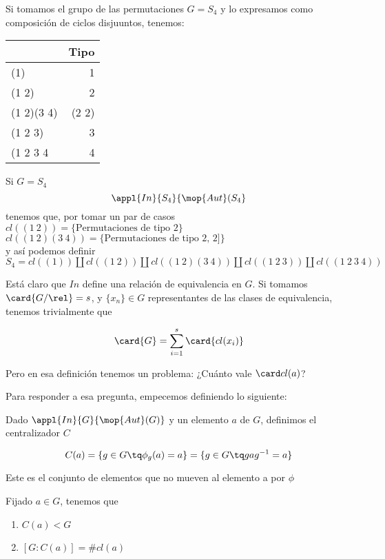 \documentclass[nochap]{apuntes}
\begin{document}
\begin{example}
Si tomamos el grupo de las permutaciones $G=S_4$ y lo expresamos como composición de ciclos disjuuntos, tenemos:\\
\begin{center}
\begin{tabular}{|l|r|}
\hline
& Tipo\\ 
\hline
(1) & 1\\
(1 2) & 2\\
(1 2)(3 4) & (2 2)\\
(1 2 3) & 3\\
(1 2 3 4 & 4\\
\hline
\end{tabular}
\end{center}
Si $G=S_4$\\
$$\appl{In}{S_4}{\mop{Aut}(S_4}$$
tenemos que, por tomar un par de casos
$cl((1\ 2)) = \{ \text{Permutaciones de tipo 2} \}$\\
$cl((1\ 2)(3\ 4)) = \{ \text{Permutaciones de tipo 2, 2]} \}$\\
y así podemos definir\\
$S_4 = cl((1)) \coprod cl((1\ 2)) \coprod cl((1\ 2)(3\ 4)) \coprod cl((1\ 2\ 3)) \coprod cl((1\ 2\ 3\ 4))$
\end{example}

Está claro que $In$ define una relación de equivalencia en $G$. Si tomamos $\card{G/\rel} = s$, y $\{x_n\}∈G$ representantes de las clases de equivalencia, tenemos trivialmente que 

\[ \card{G} = \sum_{i=1}^{s} \card{cl(x_i)} \]

Pero en esa definición tenemos un problema: ¿Cuánto vale $\card cl(a)$?

Para responder a esa pregunta, empecemos definiendo lo siguiente:

\begin{defn}[Centralizador] Dado $\appl{In}{G}{\mop{Aut}(G)}$ y un elemento $a$ de $G$, definimos el centralizador $C$

\[ C(a) = \{ g\in G \tq \phi _g(a) = a\} = \{ g\in G \tq gag^{-1} = a\} \]

Este es el conjunto de elementos que no mueven al elemento a por $\phi$
\end{defn}

\begin{theorem}\label{thmConj1}
Fijado $a\in G$, tenemos que
\begin{enumerate}
\item $C(a) < G$
\item $[ G:C(a) ] = \# cl(a) $ 
\end{enumerate}
\end{theorem}
\end{document}
